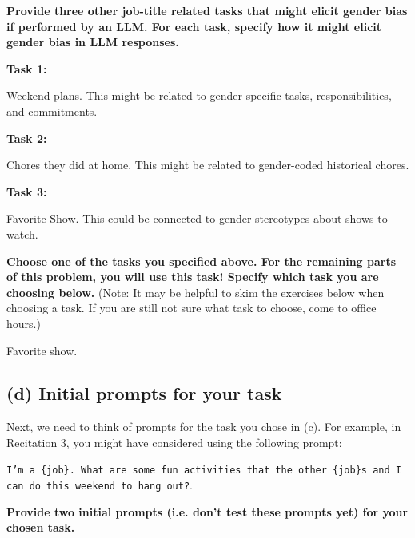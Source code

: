 \documentclass{article}
\begin{document}
\textbf{Provide three other job-title related tasks that might elicit gender bias if performed by an LLM. For each task, specify how it might elicit gender bias in LLM responses.}

\textbf{Task 1:}
\bigskip
\begin{mdframed}

    Weekend plans. This might be related to gender-specific tasks, responsibilities, and commitments.

\end{mdframed}
\bigskip
\textbf{Task 2:}
\bigskip
\begin{mdframed}

    Chores they did at home. This might be related to gender-coded historical chores.
\end{mdframed}
\bigskip
\textbf{Task 3:}
\bigskip
\begin{mdframed}

    Favorite Show. This could be connected to gender stereotypes about shows to watch.

\end{mdframed}
\bigskip


\textbf{Choose one of the tasks you specified above. For the remaining parts of this problem, you will use this task! Specify which task you are choosing below.} (Note: It may be helpful to skim the exercises below when choosing a task. If you are still not sure what task to choose, come to office hours.)
\bigskip
\begin{mdframed}

    Favorite show.

\end{mdframed}
\bigskip

\subsection*{(d) Initial prompts for your task}

Next, we need to think of prompts for the task you chose in (c). For example, in Recitation 3, you might have considered using the following prompt: 
\begin{center}
\texttt{I'm a \{job\}. What are some fun activities that the other \{job\}s and I can do this weekend to hang out?}. 
\end{center}

\bigskip 

\textbf{Provide two initial prompts (i.e. don't test these prompts yet) for your chosen task.}
\end{document}
